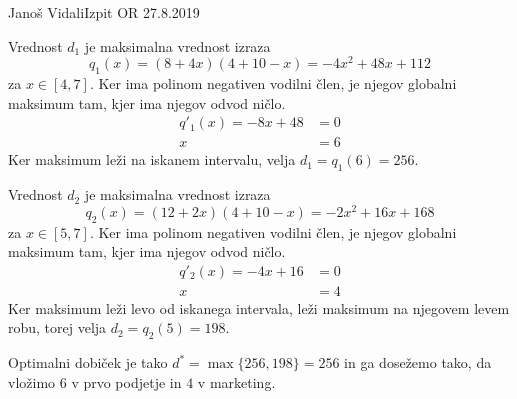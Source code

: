 \begin{naloga}{Janoš Vidali}{Izpit OR 27.8.2019}
\begin{odgovor}
\begin{enumerate}[(a)]
Vrednost $d_1$ je maksimalna vrednost izraza
$$
q_1(x) = (8 + 4x)(4 + 10 - x) = -4x^2 + 48x + 112
$$
za $x \in [4, 7]$.
Ker ima polinom negativen vodilni člen,
je njegov globalni maksimum tam, kjer ima njegov odvod ničlo.
\begin{align*}
q'_1(x) = -8x + 48 &= 0 \\
x &= 6
\end{align*}
Ker maksimum leži na iskanem intervalu, velja $d_1 = q_1(6) = 256$.

Vrednost $d_2$ je maksimalna vrednost izraza
$$
q_2(x) = (12 + 2x)(4 + 10 - x) = -2x^2 + 16x + 168
$$
za $x \in [5, 7]$.
Ker ima polinom negativen vodilni člen,
je njegov globalni maksimum tam, kjer ima njegov odvod ničlo.
\begin{align*}
q'_2(x) = -4x + 16 &= 0 \\
x &= 4
\end{align*}
Ker maksimum leži levo od iskanega intervala,
leži maksimum na njegovem levem robu,
torej velja $d_2 = q_2(5) = 198$.

Optimalni dobiček je tako $d^* = \max\{256, 198\} = 256$
in ga dosežemo tako, da vložimo $6$ v prvo podjetje in $4$ v marketing.
\end{enumerate}
\end{odgovor}
\end{naloga}
